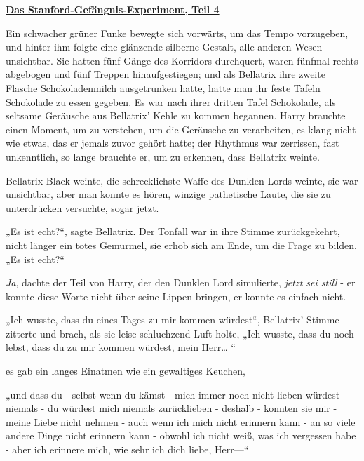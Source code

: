 

\hypertarget{das-stanford-gefuxe4ngnis-experiment-teil-4}{%

\textbf{\uline{Das Stanford-Gefängnis-Experiment, Teil 4}}

Ein schwacher grüner Funke bewegte sich vorwärts, um das Tempo vorzugeben, und hinter ihm folgte eine glänzende silberne Gestalt, alle anderen Wesen unsichtbar. Sie hatten fünf Gänge des Korridors durchquert, waren fünfmal rechts abgebogen und fünf Treppen hinaufgestiegen; und als Bellatrix ihre zweite Flasche Schokoladenmilch ausgetrunken hatte, hatte man ihr feste Tafeln Schokolade zu essen gegeben. Es war nach ihrer dritten Tafel Schokolade, als seltsame Geräusche aus Bellatrix' Kehle zu kommen begannen. Harry brauchte einen Moment, um zu verstehen, um die Geräusche zu verarbeiten, es klang nicht wie etwas, das er jemals zuvor gehört hatte; der Rhythmus war zerrissen, fast unkenntlich, so lange brauchte er, um zu erkennen, dass Bellatrix weinte.

Bellatrix Black weinte, die schrecklichste Waffe des Dunklen Lords weinte, sie war unsichtbar, aber man konnte es hören, winzige pathetische Laute, die sie zu unterdrücken versuchte, sogar jetzt.

„Es ist echt?“, sagte Bellatrix. Der Tonfall war in ihre Stimme zurückgekehrt, nicht länger ein totes Gemurmel, sie erhob sich am Ende, um die Frage zu bilden. „Es ist echt?“

\emph{Ja}, dachte der Teil von Harry, der den Dunklen Lord simulierte, \emph{jetzt sei still} - er konnte diese Worte nicht über seine Lippen bringen, er konnte es einfach nicht.

„Ich wusste, dass du eines Tages zu mir kommen würdest“, Bellatrix' Stimme zitterte und brach, als sie leise schluchzend Luft holte, „Ich wusste, dass du noch lebst, dass du zu mir kommen würdest, mein Herr… “

es gab ein langes Einatmen wie ein gewaltiges Keuchen,

„und dass du - selbst wenn du kämst - mich immer noch nicht lieben würdest - niemals - du würdest mich niemals zurücklieben - deshalb - konnten sie mir - meine Liebe nicht nehmen - auch wenn ich mich nicht erinnern kann - an so viele andere Dinge nicht erinnern kann - obwohl ich nicht weiß, was ich vergessen habe - aber ich erinnere mich, wie sehr ich dich liebe, Herr—“

}
